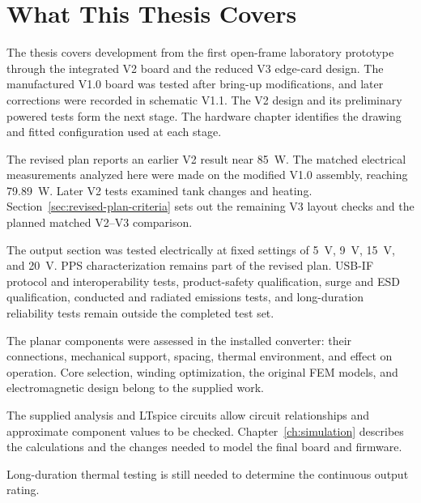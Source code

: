 \section{What This Thesis Covers}
\label{sec:intro-scope}

The thesis covers development from the first open-frame laboratory prototype through the integrated V2 board and the reduced V3 edge-card design. The manufactured V1.0 board was tested after bring-up modifications, and later corrections were recorded in schematic V1.1. The V2 design and its preliminary powered tests form the next stage. The hardware chapter identifies the drawing and fitted configuration used at each stage.

The revised plan reports an earlier V2 result near \SI{85}{\watt}. The matched electrical measurements analyzed here were made on the modified V1.0 assembly, reaching \SI{79.89}{\watt}. Later V2 tests examined tank changes and heating. Section~\ref{sec:revised-plan-criteria} sets out the remaining V3 layout checks and the planned matched V2--V3 comparison.

The output section was tested electrically at fixed settings of \SI{5}{\volt}, \SI{9}{\volt}, \SI{15}{\volt}, and \SI{20}{\volt}. PPS characterization remains part of the revised plan. USB-IF protocol and interoperability tests, product-safety qualification, surge and ESD qualification, conducted and radiated emissions tests, and long-duration reliability tests remain outside the completed test set.

The planar components were assessed in the installed converter: their connections, mechanical support, spacing, thermal environment, and effect on operation. Core selection, winding optimization, the original FEM models, and electromagnetic design belong to the supplied work.

The supplied analysis and LTspice circuits allow circuit relationships and approximate component values to be checked. Chapter~\ref{ch:simulation} describes the calculations and the changes needed to model the final board and firmware.

Long-duration thermal testing is still needed to determine the continuous output rating.
